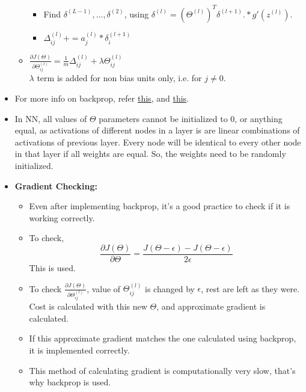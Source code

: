 \documentclass{article}
\begin{document}
\begin{itemize}
\begin{itemize}
\begin{itemize}
			\item Find $\delta^{(L-1)},\dots,\delta^{(2)}$, using $\delta^{(l)} = (\Theta^{(l)})^T \delta^{(l+1)}.*g'(z^{(l)})$.
			\item $\Delta^{(l)}_{ij}+=a_j^{(l)}*\delta_i^{(l+1)}$
		\end{itemize}
		\item $\frac{\partial J(\Theta)}{\partial \Theta^{(l)}_{ij}} = \frac{1}{m} \Delta^{(l)}_{ij} + \lambda \Theta^{(l)}_{ij}$\\$\lambda$ term is added for non bias units only, i.e. for $j\neq 0$.
	\end{itemize}
	\item For more info on backprop, refer \href{https://youtu.be/Ilg3gGewQ5U}{this,} and \href{https://youtu.be/tIeHLnjs5U8}{this}.
	\item In NN, all values of $\Theta$ parameters cannot be initialized to 0, or anything equal, as activations of different nodes in a layer is are linear combinations of activations of previous layer. Every node will be identical to every other node in that layer if all weights are equal. So, the weights need to be randomly initialized.
	\item \textbf{Gradient Checking:}\begin{itemize}
		\item Even after implementing backprop, it's a good practice to check if it is working correctly.
		\item To check, $$\frac{\partial J(\Theta)}{\partial \Theta} = \frac{J(\Theta-\epsilon)-J(\Theta-\epsilon)}{2\epsilon}$$ This is used.
	\item To check $\frac{\partial J(\Theta)}{\partial \Theta^{(l)}_{ij}}$, value of $\Theta^{(l)}_{ij}$ is changed by $\epsilon$, rest are left as they were. Cost is calculated with this new $\Theta$, and approximate gradient is calculated.
	\item If this approximate gradient matches the one calculated using backprop, it is implemented correctly.
	\item This method of calculating gradient is computationally very slow, that's why backprop is used.
	\end{itemize}
\end{itemize}
\end{document}
